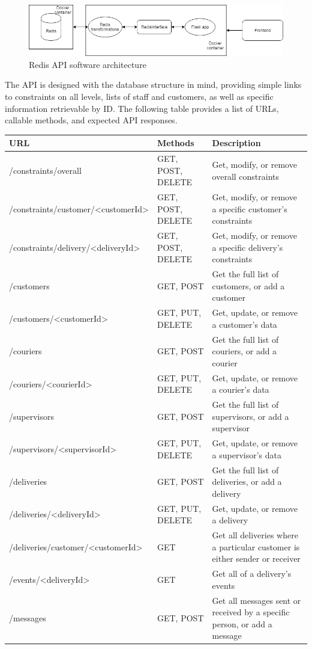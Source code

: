 \begin{figure}[h]
    \centering
    \includegraphics[scale=0.5]{redis_backend_diagram.png}
    \caption{Redis API software architecture}
    \label{fig:redis_architecturel}
\end{figure}

The API is designed with the database structure in mind, providing simple links to constraints on all levels, lists of staff and customers, as well as specific information retrievable by ID. The following table provides a list of URLs, callable methods, and expected API responses.

\begin{center}
\begin{tabular}{ | m{6.1cm} | m{3.8cm}| m{6cm} | } 
\hline
URL & Methods & Description \\
\hline
/constraints/overall & GET, POST, DELETE & Get, modify, or remove overall constraints \\
\hline
/constraints/customer/<customerId> & GET, POST, DELETE & Get, modify, or remove a specific customer's constraints \\
\hline
/constraints/delivery/<deliveryId> & GET, POST, DELETE & Get, modify, or remove a specific delivery's constraints\\
\hline
/customers & GET, POST & Get the full list of customers, or add a customer\\
\hline
/customers/<customerId> & GET, PUT, DELETE & Get, update, or remove a customer's data\\
\hline
/couriers & GET, POST & Get the full list of couriers, or add a courier\\
\hline
/couriers/<courierId> & GET, PUT, DELETE & Get, update, or remove a courier's data\\
\hline
/supervisors & GET, POST & Get the full list of supervisors, or add a supervisor\\
\hline
/supervisors/<supervisorId> & GET, PUT, DELETE & Get, update, or remove a supervisor's data\\
\hline
/deliveries & GET, POST & Get the full list of deliveries, or add a delivery\\
\hline
/deliveries/<deliveryId> & GET, PUT, DELETE & Get, update, or remove a delivery\\
\hline
/deliveries/customer/<customerId> & GET & Get all deliveries where a particular customer is either sender or receiver\\
\hline
/events/<deliveryId> & GET & Get all of a delivery's events\\
\hline
/messages & GET, POST & Get all messages sent or received by a specific person, or add a message\\
\hline
\end{tabular}
\end{center}

